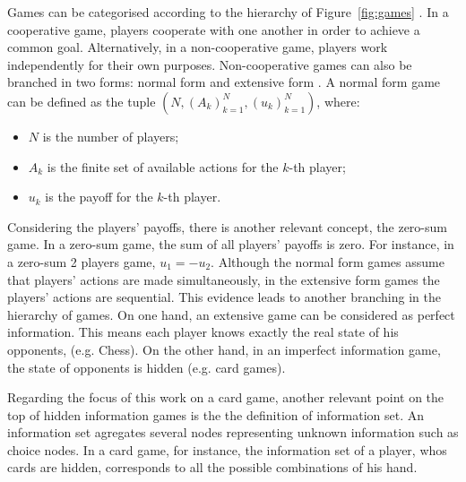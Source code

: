 Games can be categorised according to the hierarchy of Figure~\ref{fig:games} \cite{Osborne2011}.
In a cooperative game, players cooperate with one another in order to achieve a common goal.
Alternatively, in a non-cooperative game, players work independently for their own purposes.
Non-cooperative games can also be branched in two forms: normal form and extensive form \cite{Shoham2010}.
A normal form game can be defined as the tuple $(N,(A_k)_{k=1}^{N},(u_k)_{k=1}^{N})$, where:
\begin{itemize}
\item $N$ is the number of players;
\item $A_k$ is the finite set of available actions for the $k$-th player;
\item $u_k$ is the payoff for the $k$-th player.
\end{itemize}
Considering the players' payoffs, there is another relevant concept, the zero-sum game.
In a zero-sum game, the sum of all players' payoffs is zero.
For instance, in a zero-sum 2 players game, $u_1 = -u_2$.
Although the normal form games assume that players' actions are made simultaneously, in the extensive form games the players' actions are sequential.
This evidence leads to another branching in the hierarchy of games.
On one hand, an extensive game can be considered as perfect information.
This means each player knows exactly the real state of his opponents, (e.g. Chess).
On the other hand, in an imperfect information game, the state of opponents is hidden (e.g. card games).

Regarding the focus of this work on a card game, another relevant point on the top of hidden information games is the the definition of information set.
An information set agregates several nodes representing unknown information such as choice nodes. In a card game, for instance, the information set of a player, whos cards are hidden, corresponds to all the possible combinations of his hand.



